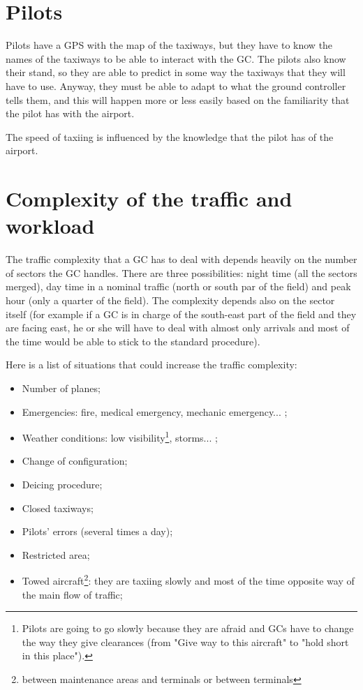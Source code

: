 \documentclass{article}
\begin{document}
\section{Pilots}
Pilots have a GPS with the map of the taxiways, but they have to know the names of the taxiways to be able to interact with the GC. The pilots also know their stand, so they are able to predict in some way the taxiways that they will have to use. Anyway, they must be able to adapt to what the ground controller tells them, and this will happen more or less easily based on the familiarity that the pilot has with the airport.

The speed of taxiing is influenced by the knowledge that the pilot has of the airport.

\section{Complexity of the traffic and workload}
The traffic complexity that a GC has to deal with depends heavily on the number of sectors the GC handles. There are three possibilities: night time (all the sectors merged), day time in a nominal traffic (north or south par of the field) and peak hour (only a quarter of the field). The complexity depends also on the sector itself (for example if a GC is in charge of the south-east part of the field and they are facing east, he or she will have to deal with almost only arrivals and most of the time would be able to stick to the standard procedure). 

Here is a list of situations that could increase the traffic complexity:
\begin{itemize}
    \item Number of planes;
    \item Emergencies: fire, medical emergency, mechanic emergency... ; 
    \item Weather conditions: low visibility\footnote{Pilots are going to go slowly because they are afraid and GCs have to change the way they give clearances (from "Give way to this aircraft" to "hold short in this place").}, storms... ;
    \item Change of configuration;
    \item Deicing procedure;
    \item Closed taxiways;
    \item Pilots' errors (several times a day);
    \item Restricted area;
    \item Towed aircraft\footnote{between maintenance areas and terminals or between terminals}: they are taxiing slowly and most of the time opposite way of the main flow of traffic;
\end{itemize}
\end{document}
